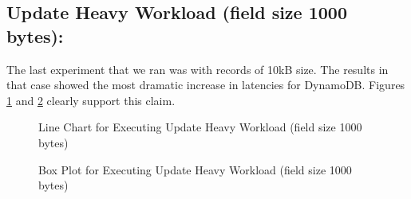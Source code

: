 \documentclass[letterpaper, 10 pt, conference]{ieeeconf}  %
\begin{document}
\subsection{Update Heavy Workload (field size 1000 bytes):}
 The last experiment that we ran was with records of 10kB size. The results in that case showed the most dramatic increase in latencies for DynamoDB. Figures \ref{fig:workloadA_size1000} and \ref{fig:boxplot_size1000} clearly support this claim.
 
\begin{figure}[h]
\centering
{}
\caption{Line Chart for Executing Update Heavy Workload (field size 1000 bytes)}
\label{fig:workloadA_size1000}
\end{figure}  

\begin{figure}[h]
\centering
{}
\caption{Box Plot for Executing Update Heavy Workload (field size 1000 bytes)}
\label{fig:boxplot_size1000}
\end{figure}    
\end{document}
